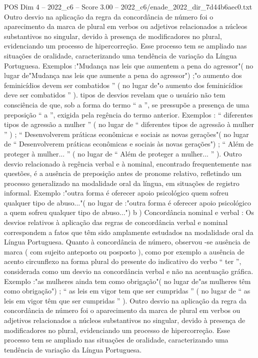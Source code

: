 \begin{textsample}{POS Dim 4 – 2022\_c6 – Score 3.00 – 2022\_c6/enade\_2022\_dir\_7d44b6aec0.txt}
Outro desvio na aplicação da regra da concordância de número foi o aparecimento da marca de plural em verbos ou adjetivos relacionados a núcleos substantivos no singular, devido à presença de modificadores no plural, evidenciando um processo de hipercorreção.
Esse processo tem se ampliado nas situações de oralidade, caracterizando uma tendência de variação da Língua Portuguesa.
Exemplos :"Mudança nas leis que aumentem a pena do agressor"( no lugar de"Mudança nas leis que aumente a pena do agressor") ;"o aumento dos feminicídios devem ser combatidos ” ( no lugar de"o aumento dos feminicídios deve ser combatidos ” ). tipos de desvios revelam que o usuário não tem consciência de que, sob a forma do termo “ a ”, se pressupõe a presença de uma preposição “ a ”, exigida pela regência do termo anterior.
Exemplos : “ diferentes tipos de agressão a mulher ” ( no lugar de “ diferentes tipos de agressão à mulher ” ) ; “ Desenvolverem práticas econômicas e sociais as novas gerações"( no lugar de “ Desenvolverem práticas econômicas e sociais às novas gerações") ; “ Além de proteger à mulher... ” ( no lugar de “ Além de proteger a mulher... ” ).
Outro desvio relacionado à regência verbal e à nominal, encontrado frequentemente nas questões, é a ausência de preposição antes de pronome relativo, refletindo um processo generalizado na modalidade oral da língua, em situações de registro informal.
Exemplo :"outra forma é oferecer apoio psicológico quem sofreu qualquer tipo de abuso..."( no lugar de :"outra forma é oferecer apoio psicológico a quem sofreu qualquer tipo de abuso...") b ) Concordância nominal e verbal : Os desvios relativos à aplicação das regras de concordância verbal e nominal correspondem a fatos que têm sido amplamente estudados na modalidade oral da Língua Portuguesa.
Quanto à concordância de número, observou -se ausência de marca ( com sujeito anteposto ou posposto ), como por exemplo a ausência de acento circunflexo na forma plural do presente do indicativo do verbo “ ter ”, considerada como um desvio na concordância verbal e não na acentuação gráfica.
Exemplo :"as mulheres ainda tem como obrigação"( no lugar de"as mulheres têm como obrigação") ; “ as leis em vigor tem que ser cumpridas ” ( no lugar de “ as leis em vigor têm que ser cumpridas ” ).
Outro desvio na aplicação da regra da concordância de número foi o aparecimento da marca de plural em verbos ou adjetivos relacionados a núcleos substantivos no singular, devido à presença de modificadores no plural, evidenciando um processo de hipercorreção.
Esse processo tem se ampliado nas situações de oralidade, caracterizando uma tendência de variação da Língua Portuguesa.

\end{textsample}
